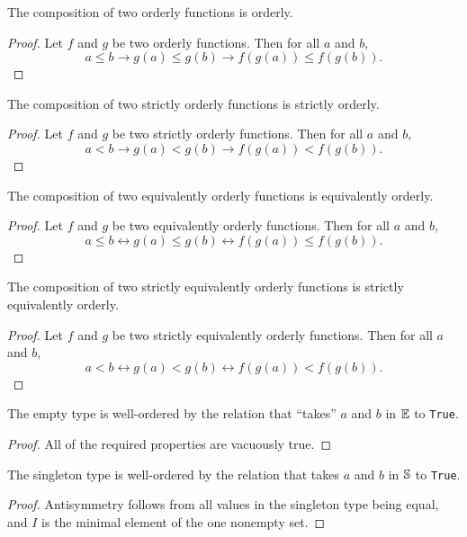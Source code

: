 \documentclass[../../math.tex]{subfiles}
\begin{document}
\begin{instance} \label{homo_le_compose}
    The composition of two orderly functions is orderly.
\end{instance}
\begin{proof}
    Let $f$ and $g$ be two orderly functions.  Then for all $a$ and $b$,
    \[
        a \leq b \to g(a) \leq g(b) \to f(g(a)) \leq f(g(b)).
    \]
\end{proof}

\begin{instance}
    The composition of two strictly orderly functions is strictly orderly.
\end{instance}
\begin{proof}
    Let $f$ and $g$ be two strictly orderly functions.  Then for all $a$ and
    $b$,
    \[
        a < b \to g(a) < g(b) \to f(g(a)) < f(g(b)).
    \]
\end{proof}

\begin{instance}
    The composition of two equivalently orderly functions is equivalently
    orderly.
\end{instance}
\begin{proof}
    Let $f$ and $g$ be two equivalently orderly functions.  Then for all $a$ and
    $b$,
    \[
        a \leq b \leftrightarrow g(a) \leq g(b) \leftrightarrow f(g(a)) \leq
        f(g(b)).
    \]
\end{proof}

\begin{instance}
    The composition of two strictly equivalently orderly functions is strictly
    equivalently orderly.
\end{instance}
\begin{proof}
    Let $f$ and $g$ be two strictly equivalently orderly functions.  Then for
    all $a$ and $b$,
    \[
        a < b \leftrightarrow g(a) < g(b) \leftrightarrow f(g(a)) < f(g(b)).
    \]
\end{proof}

\begin{instance}
    The empty type is well-ordered by the relation that ``takes'' $a$ and $b$ in
    $\E$ to \verb|True|.
\end{instance}
\begin{proof}
    All of the required properties are vacuously true.
\end{proof}

\begin{instance}
    The singleton type is well-ordered by the relation that takes $a$ and $b$ in
    $\S$ to \verb|True|.
\end{instance}
\begin{proof}
    Antisymmetry follows from all values in the singleton type being equal, and
    $I$ is the minimal element of the one nonempty set.
\end{proof}
\end{document}
